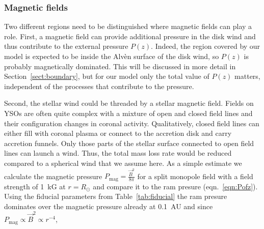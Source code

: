 \subsubsection{Magnetic fields}
Two different regions need to be distinguished where magnetic fields can play a role. First, a magnetic field can provide additional pressure in the disk wind and thus contribute to the external pressure $P(z)$. Indeed, the region covered by our model is expected to be inside the Alv\`en surface of the disk wind, so $P(z)$ is probably magnetically dominated. This will be discussed in more detail in Section~\ref{sect:boundary}, but for our model only the total value of $P(z)$ matters, independent of the processes that contribute to the pressure. 

Second, the stellar wind could be threaded by a stellar magnetic field. Fields on YSOs are often quite complex with a mixture of open and closed field lines \citep[e.g.][]{2011MNRAS.417..472D,2012MNRAS.425.2948D} and their configuration changes in coronal activity.
Qualitatively, closed field lines can either fill with coronal plasma or connect to the accretion disk and carry accretion funnels. Only those parts of the stellar surface connected to open field lines can launch a wind. Thus, the total mass loss rate would be reduced compared to a spherical wind that we assume here. 
As a simple estimate we calculate the magnetic pressure $P_{\textrm{mag}}=\frac{\vec B^2}{8 \pi}$ for a split monopole field with a field strength of 1~kG at $r=R_\odot$ and compare it to the ram presure (eqn.~\ref{eqn:Pofz}). Using the fiducial parameters from Table~\ref{tab:fiducial} the ram presure dominates over the magnetic pressure already at 0.1~AU and since $P_{\textrm{mag}} \propto \vec B^2 \propto r^{-4}$, %



